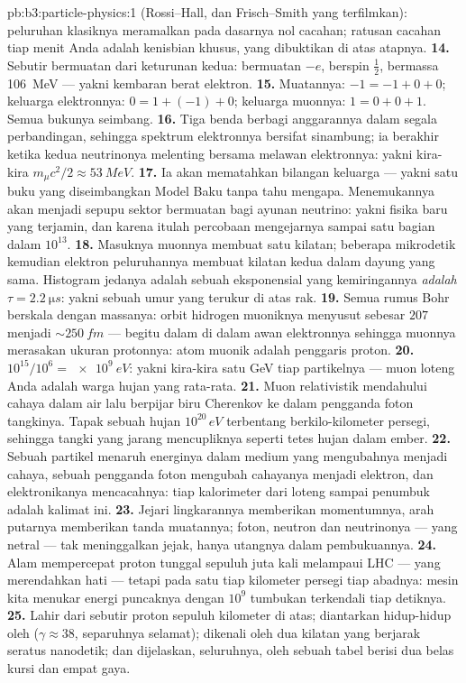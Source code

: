 \begin{solution}{pb:b3:particle-physics:1}
(Rossi--Hall, dan Frisch--Smith yang terfilmkan): peluruhan
klasiknya meramalkan pada dasarnya nol cacahan; ratusan cacahan tiap menit
Anda adalah kenisbian khusus, yang dibuktikan di atas  atapnya.
\textbf{14.} Sebutir  bermuatan dari keturunan kedua:
bermuatan $-e$, berspin $\tfrac12$, bermassa \qty{106}{MeV} --- yakni
kembaran berat elektron.
\textbf{15.} Muatannya: $-1 = -1 + 0 + 0$; keluarga elektronnya:
$0 = 1 + (-1) + 0$; keluarga muonnya: $1 = 0 + 0 + 1$. Semua bukunya
seimbang.
\textbf{16.} Tiga benda berbagi anggarannya dalam segala perbandingan,
sehingga spektrum elektronnya bersifat sinambung; ia berakhir ketika kedua
neutrinonya melenting bersama melawan elektronnya: yakni kira-kira
$m_\mu c^2/2 \approx \qty{53}{MeV}$.
\textbf{17.} Ia akan mematahkan bilangan keluarga  --- yakni satu
buku yang diseimbangkan Model Baku tanpa tahu mengapa. Menemukannya
akan menjadi sepupu sektor bermuatan bagi ayunan neutrino:
yakni fisika baru yang terjamin, dan karena itulah percobaan mengejarnya sampai
satu bagian dalam $10^{13}$.
\textbf{18.} Masuknya muonnya membuat satu kilatan; beberapa mikrodetik
kemudian elektron peluruhannya membuat kilatan kedua dalam dayung yang sama.
Histogram jedanya adalah sebuah eksponensial yang kemiringannya \emph{adalah}
$\tau = \qty{2.2}{\micro s}$: yakni sebuah umur yang terukur di atas rak.
\textbf{19.} Semua rumus Bohr berskala dengan massanya: orbit
hidrogen muoniknya menyusut sebesar $207$ menjadi ${\sim}\qty{250}{fm}$ ---
begitu dalam di dalam awan elektronnya sehingga muonnya merasakan
ukuran protonnya: atom muonik adalah penggaris proton.
\textbf{20.} $10^{15}/10^{6} = \qty{e9}{eV}$: yakni kira-kira satu GeV tiap
partikelnya --- muon loteng Anda adalah warga hujan yang rata-rata.
\textbf{21.} Muon relativistik mendahului cahaya dalam air lalu berpijar
biru Cherenkov ke dalam pengganda foton tangkinya. Tapak sebuah hujan
$10^{20}\,\unit{eV}$ terbentang berkilo-kilometer persegi, sehingga tangki yang
jarang mencupliknya seperti tetes hujan dalam
ember.
\textbf{22.} Sebuah partikel menaruh energinya dalam medium yang
mengubahnya menjadi cahaya, sebuah pengganda foton mengubah cahayanya menjadi
elektron, dan elektronikanya mencacahnya: tiap kalorimeter dari
loteng sampai penumbuk adalah kalimat ini.
\textbf{23.} Jejari lingkarannya memberikan momentumnya, arah putarnya memberikan
tanda muatannya; foton, neutron dan neutrinonya ---
yang netral --- tak meninggalkan jejak, hanya utangnya dalam
pembukuannya.
\textbf{24.} Alam mempercepat proton tunggal sepuluh juta
kali melampaui LHC --- yang merendahkan hati --- tetapi pada satu tiap kilometer
persegi tiap abadnya: mesin kita menukar energi puncaknya dengan
$10^{9}$ tumbukan terkendali tiap detiknya.
\textbf{25.} Lahir dari sebutir proton sepuluh kilometer di atas; diantarkan
hidup-hidup oleh  ($\gamma \approx 38$, separuhnya selamat);
dikenali oleh dua kilatan yang berjarak seratus nanodetik; dan
dijelaskan, seluruhnya, oleh sebuah tabel berisi dua belas kursi dan empat
gaya.
\end{solution}
